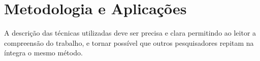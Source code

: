 \chapter{Metodologia e Aplicações}\label{cap4}

A descrição das técnicas utilizadas deve ser precisa e clara permitindo ao leitor a compreensão do trabalho, e tornar possível que outros pesquisadores repitam na íntegra o mesmo método.
